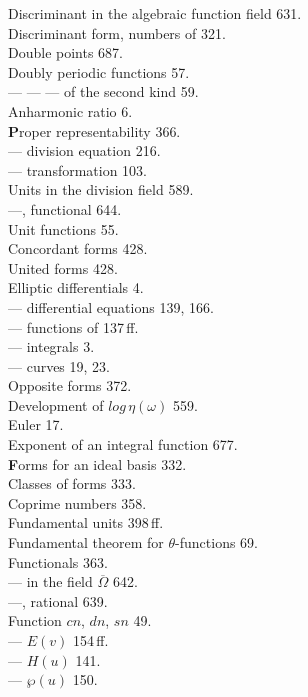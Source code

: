 
\noindent
\begin{minipage}[t]{0.48\textwidth}
\noindent
Discriminant in the algebraic function field 631. \\
Discriminant form, numbers of 321. \\
Double points 687. \\
Doubly periodic functions 57. \\
--- --- --- of the second kind 59. \\
Anharmonic ratio 6. \\[4pt]
\textbf{P}roper representability 366. \\
--- division equation 216. \\
--- transformation 103. \\
Units in the division field 589. \\
---, functional 644. \\
Unit functions 55. \\
Concordant forms 428. \\
United forms 428. \\
Elliptic differentials 4. \\
--- differential equations 139, 166. \\
--- functions of  137\,ff. \\
--- integrals 3. \\
--- curves 19, 23. \\
Opposite forms 372. \\
Development of $\mathit{log}\,\eta(\omega)$ 559. \\
Euler 17. \\
Exponent of an integral function 677. \\[4pt]
\textbf{F}orms for an ideal basis 332. \\
Classes of forms 333. \\
Coprime numbers 358. \\
Fundamental units 398\,ff. \\
Fundamental theorem for $\theta$-functions 69. \\
Functionals 363. \\
--- in the field $\overline{\Omega}$ 642. \\
---, rational 639. \\
Function $cn$, $dn$, $sn$ 49. \\
--- $E(v)$ 154\,ff. \\
--- $H(u)$ 141. \\
--- $\wp(u)$ 150. \\

\end{minipage}
